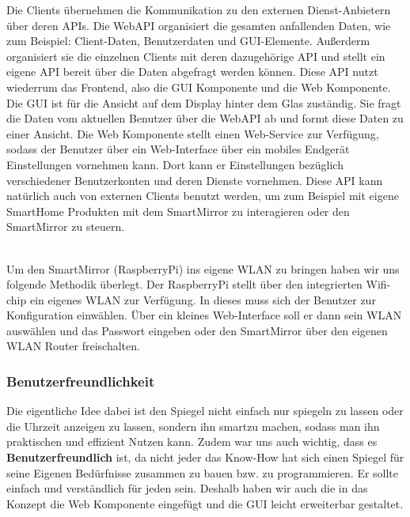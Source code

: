Die Clients übernehmen die Kommunikation zu den externen Dienst-Anbietern über deren APIs. Die WebAPI organisiert die gesamten anfallenden Daten, wie zum Beispiel: Client-Daten, Benutzerdaten und GUI-Elemente. Außerderm organisiert sie die einzelnen Clients mit deren dazugehörige API und stellt ein eigene API bereit über die Daten abgefragt werden können. Diese API nutzt wiederrum das Frontend, also die GUI Komponente und die Web Komponente. Die GUI ist für die Ansicht auf dem Display hinter dem Glas zuständig. Sie fragt die Daten vom aktuellen Benutzer über die WebAPI ab und formt diese Daten zu einer Ansicht. Die Web Komponente stellt einen Web-Service zur Verfügung, sodass der Benutzer über ein Web-Interface über ein mobiles Endgerät Einstellungen vornehmen kann. Dort kann er Einstellungen bezüglich verschiedener Benutzerkonten und deren Dienste vornehmen. Diese API kann natürlich auch von externen Clients benutzt werden, um zum Beispiel mit eigene SmartHome Produkten mit dem SmartMirror zu interagieren oder den SmartMirror zu steuern.\\\

Um den SmartMirror (RaspberryPi) ins eigene WLAN zu bringen haben wir uns folgende Methodik überlegt. Der RaspberryPi stellt über den integrierten Wifi-chip ein eigenes WLAN zur Verfügung. In dieses muss sich der Benutzer zur Konfiguration einwählen. Über ein kleines Web-Interface soll er dann sein WLAN auswählen und das Passwort eingeben oder den SmartMirror über den eigenen WLAN Router freischalten.


\subsubsection{Benutzerfreundlichkeit}\label{Benutzerfreundlichkeit}
Die eigentliche Idee dabei ist den Spiegel nicht einfach nur spiegeln zu lassen oder die Uhrzeit anzeigen zu lassen, sondern ihn \dq smart\dq zu machen, sodass man ihn praktischen und effizient Nutzen kann. Zudem war uns auch wichtig, dass es \textbf{Benutzerfreundlich} ist, da nicht jeder das Know-How hat sich einen Spiegel für seine Eigenen Bedürfnisse zusammen zu bauen bzw. zu programmieren. Er sollte einfach und verständlich für jeden sein. Deshalb haben wir auch die in das Konzept die Web Komponente eingefügt und die GUI leicht erweiterbar gestaltet.


